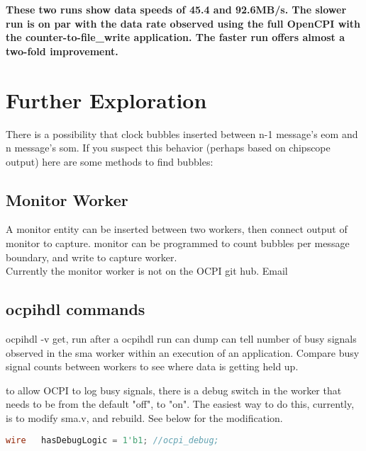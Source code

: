 \textbf{These two runs show data speeds of 45.4 and 92.6MB/s.  The slower run is on par with the data rate observed using the full OpenCPI with the counter-to-file\_write application.  The faster run offers almost a two-fold improvement.}

\section{Further Exploration}

There is a possibility that clock bubbles inserted between n-1 message's eom and n message's som.  If you suspect this behavior (perhaps based on chipscope output) here are some methods to find bubbles:

\subsection{Monitor Worker}
A monitor entity can be inserted between two workers, then connect output of monitor to capture.  monitor can be programmed to count bubbles per message boundary, and write to capture worker.\\

Currently the monitor worker is not on the OCPI git hub.  Email \\

\subsection{ocpihdl commands}
ocpihdl -v get, run after a ocpihdl run can dump can tell number of busy signals observed in the sma worker within an execution of an application.  Compare busy signal counts between workers to see where data is getting held up.

to allow OCPI to log busy signals, there is a debug switch in the worker that needs to be from the default "off", to "on".  The easiest way to do this, currently, is to modify sma.v, and rebuild.  See below for the modification.

\begin{lstlisting}[language=verilog]
  wire 	 hasDebugLogic = 1'b1; //ocpi_debug;
\end{lstlisting}



